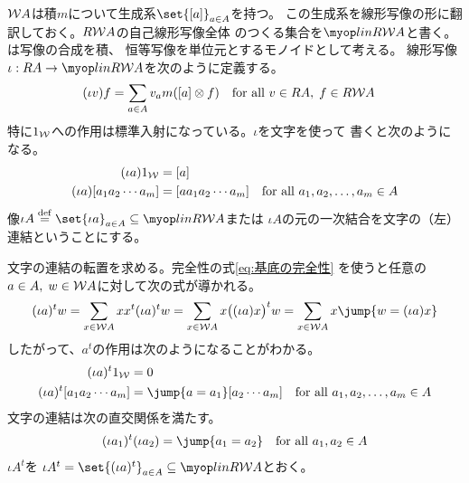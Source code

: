 	$\mathcal{W}{A}$は積$m$について生成系$\set{\word{a}}_{a\in A}$を持つ。
	この生成系を線形写像の形に翻訳しておく。$R\mathcal{W}{A}$の自己線形写像全体
	のつくる集合を$\lin{R\Word{A}}$と書く。は写像の合成を積、
	恒等写像を単位元とするモノイドとして考える。
	線形写像$\iota:RA\to \lin{R\Word{A}}$を次のように定義する。
	\begin{equation}\label{eq:文字の連結作用素}\begin{split} %
		(\iota v) f &= \sum_{a\in A}v_am(\word{a}\otimes f)
		\quad\text{for all }v\in RA,\;f\in R\Word{A} 
	\end{split}\end{equation} %
	特に$1_{\mathcal{W}{}}$への作用は標準入射になっている。$\iota$を文字を使って
	書くと次のようになる。
	\begin{equation*}\begin{split} %
		(\iota a)\wordu{} &= \word{a} \\
		(\iota a)\word{a_1a_2\cdots a_m} &= \word{aa_1a_2\cdots a_m}
		\quad\text{for all }a_1,a_2,\dots,a_m\in A
	\end{split}\end{equation*} %
	像$\iota A\mydef\set{\iota a}_{a\in A}\subseteq\lin{R\Word{A}}$または
	$\iota A$の元の一次結合を文字の（左）連結ということにする。

	文字の連結の転置を求める。完全性の式\eqref{eq:基底の完全性}
	を使うと任意の$a\in A,\;w\in \mathcal{W}{A}$に対して次の式が導かれる。
	\begin{equation*}\begin{split} %
		(\iota a)^tw = \sum_{x\in\Word{A}}xx^t(\iota a)^tw
		= \sum_{x\in\Word{A}}x\bigl((\iota a)x\bigr)^tw
		= \sum_{x\in\Word{A}}x\jump{w=(\iota a)x}
	\end{split}\end{equation*} %
	したがって、$a^t$の作用は次のようになることがわかる。
	\begin{equation*}\begin{split} %
		(\iota a)^t\wordu{} &= 0 \\
		(\iota a)^t\word{a_1a_2\cdots a_m} &= \jump{a=a_1}\word{a_2\cdots a_m}
		\quad\text{for all }a_1,a_2,\dots,a_m\in A
	\end{split}\end{equation*} %
	文字の連結は次の直交関係を満たす。
	\begin{equation*}\begin{split} %
		(\iota a_1)^t(\iota a_2) = \jump{a_1=a_2}
		\quad\text{for all }a_1,a_2\in A
	\end{split}\end{equation*} %
	$\iota A^t$を
	$\iota A^t=\set{(\iota a)^t}_{a\in A}\subseteq\lin{R\Word{A}}$とおく。

